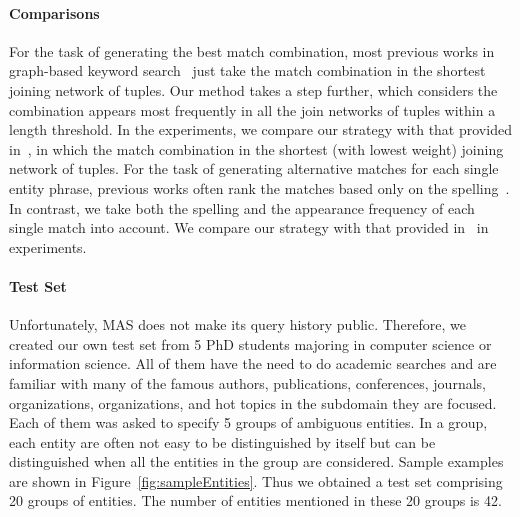 \documentclass{vldb}
\begin{document}
\paragraph*{Comparisons}
For the task of generating the best match combination, most previous works in graph-based keyword search~\cite{DBLP:conf/icde/BhalotiaHNCS02,DBLP:conf/icde/DingYWQZL07,DBLP:conf/sigmod/GolenbergKS08} just take the match combination in the shortest joining network of tuples.  Our method takes a step further, which considers the combination appears most frequently in all the join networks of tuples within a length threshold.  In the experiments, we compare our strategy with that provided in~\cite{DBLP:conf/sigmod/GolenbergKS08}, in which the match combination in the shortest (with lowest weight) joining network of tuples.  For the task of generating alternative matches for each single entity phrase, previous works often rank the matches based only on the spelling~\cite{DBLP:journals/pvldb/LiJ14}.  In contrast, we take both the spelling and the appearance frequency of each single match into account.  We compare our strategy with that provided in~\cite{DBLP:journals/pvldb/LiJ14} in experiments. 

\paragraph*{Test Set}
Unfortunately, MAS does not make its query history public. Therefore, we created our own test set from 5 PhD students majoring in computer science or information science. All of them have the need to do academic searches and are familiar with many of the famous authors, publications, conferences, journals, organizations, organizations, and hot topics in the subdomain they are focused.  Each of them was asked to specify 5 groups of ambiguous entities.  In a group, each entity are often not easy to be distinguished by itself but can be distinguished when all the entities in the group are considered.  Sample examples are shown in Figure~\ref{fig:sampleEntities}.  Thus we obtained a test set comprising 20 groups of entities.  The number of entities mentioned in these 20 groups is 42.  
\end{document}
